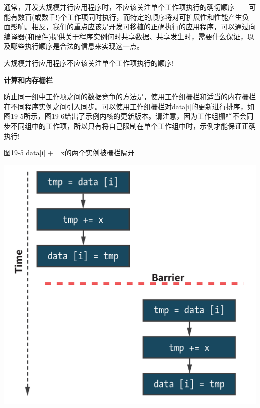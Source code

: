 通常，开发大规模并行应用程序时，不应该关注单个工作项执行的确切顺序——可能有数百(或数千!)个工作项同时执行，而特定的顺序将对可扩展性和性能产生负面影响。相反，我们的重点应该是开发可移植的正确执行的应用程序，可以通过向编译器(和硬件)提供关于程序实例何时共享数据、共享发生时，需要什么保证，以及哪些执行顺序是合法的信息来实现这一点。\par

\begin{tcolorbox}[colback=red!5!white,colframe=red!75!black]
大规模并行应用程序不应该关注单个工作项执行的顺序!
\end{tcolorbox}

\hspace*{\fill} \par %
\textbf{计算和内存栅栏}

防止同一组中工作项之间的数据竞争的方法是，使用工作组栅栏和适当的内存栅栏在不同程序实例之间引入同步。可以使用工作组栅栏对data[i]的更新进行排序，如图19-5所示，图19-6给出了示例内核的更新版本。请注意，因为工作组栅栏不会同步不同组中的工作项，所以只有将自己限制在单个工作组中时，示例才能保证正确执行!\par

\hspace*{\fill} \par %
图19-5 data[i] += x的两个实例被栅栏隔开
\begin{center}
	\includegraphics[width=1.0\textwidth]{content/chapter-19/images/4}
\end{center}

